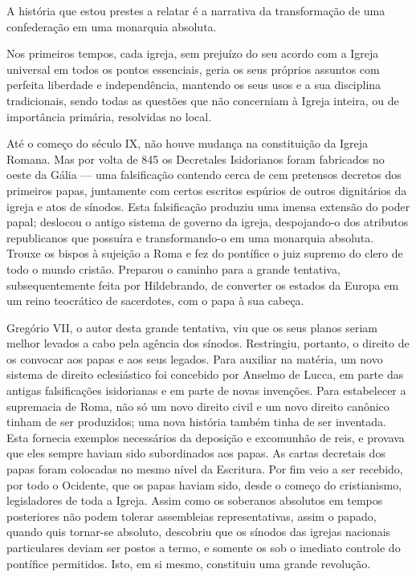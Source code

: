 \documentclass[11pt,a5paper,twoside,openany]{book}
\begin{document}
A história que estou prestes a relatar é a narrativa da transformação de uma confederação em uma monarquia absoluta.

Nos primeiros tempos, cada igreja, sem prejuízo do seu acordo com a Igreja universal em todos os pontos essenciais, geria os seus próprios assuntos com perfeita liberdade e independência, mantendo os seus usos e a sua disciplina tradicionais, sendo todas as questões que não concerniam à Igreja inteira, ou de importância primária, resolvidas no local.

Até o começo do século IX, não houve mudança na constituição da Igreja Romana. Mas por volta de 845 os Decretales Isidorianos foram fabricados no oeste da Gália — uma falsificação contendo cerca de cem pretensos decretos dos primeiros papas, juntamente com certos escritos espúrios de outros dignitários da igreja e atos de sínodos. Esta falsificação produziu uma imensa extensão do poder papal; deslocou o antigo sistema de governo da igreja, despojando-o dos atributos republicanos que possuíra e transformando-o em uma monarquia absoluta. Trouxe os bispos à sujeição a Roma e fez do pontífice o juiz supremo do clero de todo o mundo cristão. Preparou o caminho para a grande tentativa, subsequentemente feita por Hildebrando, de converter os estados da Europa em um reino teocrático de sacerdotes, com o papa à sua cabeça.

Gregório VII, o autor desta grande tentativa, viu que os seus planos seriam melhor levados a cabo pela agência dos sínodos. Restringiu, portanto, o direito de os convocar aos papas e aos seus legados. Para auxiliar na matéria, um novo sistema de direito eclesiástico foi concebido por Anselmo de Lucca, em parte das antigas falsificações isidorianas e em parte de novas invenções. Para estabelecer a supremacia de Roma, não só um novo direito civil e um novo direito canônico tinham de ser produzidos; uma nova história também tinha de ser inventada. Esta fornecia exemplos necessários da deposição e excomunhão de reis, e provava que eles sempre haviam sido subordinados aos papas. As cartas decretais dos papas foram colocadas no mesmo nível da Escritura. Por fim veio a ser recebido, por todo o Ocidente, que os papas haviam sido, desde o começo do cristianismo, legisladores de toda a Igreja. Assim como os soberanos absolutos em tempos posteriores não podem tolerar assembleias representativas, assim o papado, quando quis tornar-se absoluto, descobriu que os sínodos das igrejas nacionais particulares deviam ser postos a termo, e somente os sob o imediato controle do pontífice permitidos. Isto, em si mesmo, constituiu uma grande revolução.
\end{document}
